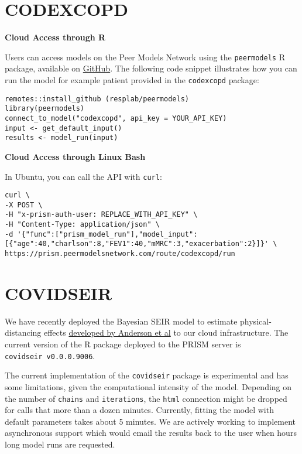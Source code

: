 \documentclass[
]{book}
\begin{document}
\hypertarget{codexcopd}{%
\section{CODEXCOPD}\label{codexcopd}}

\textbf{Cloud Access through R}

Users can access models on the Peer Models Network using the \texttt{peermodels} R package, available on \href{https://github.com/resplab/peermodels}{GitHub}. The following code snippet illustrates how you can run the model for example patient provided in the \texttt{codexcopd} package:

\begin{verbatim}
remotes::install_github (resplab/peermodels)
library(peermodels)
connect_to_model("codexcopd", api_key = YOUR_API_KEY)
input <- get_default_input()
results <- model_run(input)
\end{verbatim}

\textbf{Cloud Access through Linux Bash}

In Ubuntu, you can call the API with \texttt{curl}:

\begin{verbatim}
curl \
-X POST \
-H "x-prism-auth-user: REPLACE_WITH_API_KEY" \
-H "Content-Type: application/json" \
-d '{"func":["prism_model_run"],"model_input":[{"age":40,"charlson":8,"FEV1":40,"mMRC":3,"exacerbation":2}]}' \
https://prism.peermodelsnetwork.com/route/codexcopd/run
\end{verbatim}

\hypertarget{covidseir}{%
\section{COVIDSEIR}\label{covidseir}}

We have recently deployed the Bayesian SEIR model to estimate physical-distancing effects \href{https://doi.org/10.1101/2020.04.17.20070086}{developed by Anderson et al} to our cloud infrastructure. The current version of the R package deployed to the PRISM server is \texttt{covidseir\ v0.0.0.9006}.

The current implementation of the \texttt{covidseir} package is experimental and has some limitations, given the computational intensity of the model. Depending on the number of \texttt{chains} and \texttt{iterations}, the \texttt{html} connection might be dropped for calls that more than a dozen minutes.
Currently, fitting the model with default parameters takes about 5 minutes. We are actively working to implement asynchronous support which would email the results back to the user when hours long model runs are requested.
\end{document}
